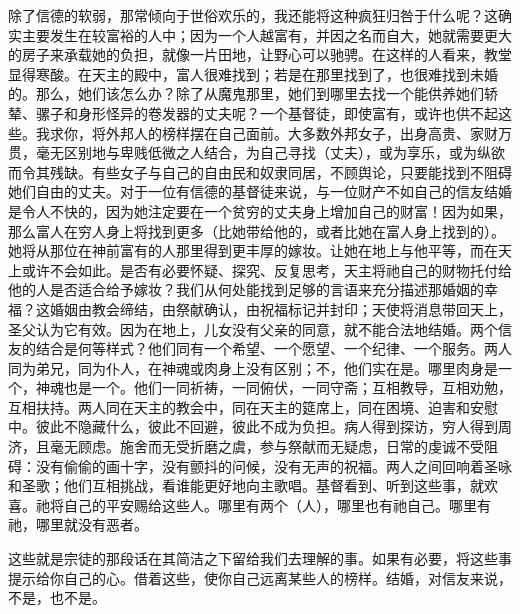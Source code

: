 除了信德的软弱，那常倾向于世俗欢乐的，我还能将这种疯狂归咎于什么呢？这确实主要发生在较富裕的人中；因为一个人越富有，并因之名而自大，她就需要更大的房子来承载她的负担，就像一片田地，让野心可以驰骋。在这样的人看来，教堂显得寒酸。在天主的殿中，富人很难找到；若是在那里找到了，也很难找到未婚的。那么，她们该怎么办？除了从魔鬼那里，她们到哪里去找一个能供养她们轿辇、骡子和身形怪异的卷发器的丈夫呢？一个基督徒，即使富有，或许也供不起这些。我求你，将外邦人的榜样摆在自己面前。大多数外邦女子，出身高贵、家财万贯，毫无区别地与卑贱低微之人结合，为自己寻找（丈夫），或为享乐，或为纵欲而令其残缺。有些女子与自己的自由民和奴隶同居，不顾舆论，只要能找到不阻碍她们自由的丈夫。对于一位有信德的基督徒来说，与一位财产不如自己的信友结婚是令人不快的，因为她注定要在一个贫穷的丈夫身上增加自己的财富！因为如果，那么富人在穷人身上将找到更多（比她带给他的，或者比她在富人身上找到的）。她将从那位在神前富有的人那里得到更丰厚的嫁妆。让她在地上与他平等，而在天上或许不会如此。是否有必要怀疑、探究、反复思考，天主将祂自己的财物托付给他的人是否适合给予嫁妆？我们从何处能找到足够的言语来充分描述那婚姻的幸福？这婚姻由教会缔结，由祭献确认，由祝福标记并封印；天使将消息带回天上，圣父认为它有效。因为在地上，儿女没有父亲的同意，就不能合法地结婚。两个信友的结合是何等样式？他们同有一个希望、一个愿望、一个纪律、一个服务。两人同为弟兄，同为仆人，在神魂或肉身上没有区别；不，他们实在是。哪里肉身是一个，神魂也是一个。他们一同祈祷，一同俯伏，一同守斋；互相教导，互相劝勉，互相扶持。两人同在天主的教会中，同在天主的筵席上，同在困境、迫害和安慰中。彼此不隐藏什么，彼此不回避，彼此不成为负担。病人得到探访，穷人得到周济，且毫无顾虑。施舍而无受折磨之虞，参与祭献而无疑虑，日常的虔诚不受阻碍：没有偷偷的画十字，没有颤抖的问候，没有无声的祝福。两人之间回响着圣咏和圣歌；他们互相挑战，看谁能更好地向主歌唱。基督看到、听到这些事，就欢喜。祂将自己的平安赐给这些人。哪里有两个（人），哪里也有祂自己。哪里有祂，哪里就没有恶者。\par

这些就是宗徒的那段话在其简洁之下留给我们去理解的事。如果有必要，将这些事提示给你自己的心。借着这些，使你自己远离某些人的榜样。结婚，对信友来说，不是，也不是。\par

